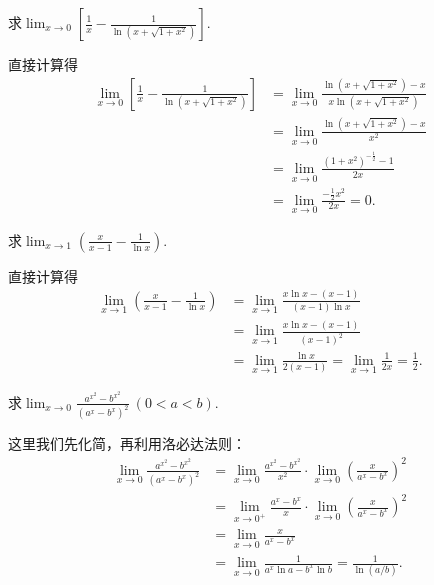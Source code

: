 \begin{example}
求\(\lim_{x\to0} \left[ \frac1x - \frac1{\ln(x+\sqrt{1+x^2})} \right]\).
\begin{solution}
直接计算得\begin{align*}
	\lim_{x\to0} \left[ \frac1x - \frac1{\ln(x+\sqrt{1+x^2})} \right]
	&= \lim_{x\to0} \frac{\ln(x+\sqrt{1+x^2}) - x}{x \ln(x+\sqrt{1+x^2})} \\
	&= \lim_{x\to0} \frac{\ln(x+\sqrt{1+x^2}) - x}{x^2} \\
	&= \lim_{x\to0} \frac{(1+x^2)^{-\frac12}-1}{2x} \\
	&= \lim_{x\to0} \frac{-\frac12 x^2}{2x}
	= 0.
\end{align*}
\end{solution}
\end{example}
\begin{example}
求\(\lim_{x\to1} \left( \frac{x}{x-1} - \frac1{\ln x} \right)\).
\begin{solution}
直接计算得\begin{align*}
	\lim_{x\to1} \left( \frac{x}{x-1} - \frac1{\ln x} \right)
	&= \lim_{x\to1} \frac{x \ln x - (x-1)}{(x-1) \ln x} \\
	&= \lim_{x\to1} \frac{x \ln x - (x-1)}{(x-1)^2} \\
	&= \lim_{x\to1} \frac{\ln x}{2(x-1)}
	= \lim_{x\to1} \frac1{2x}
	= \frac12.
\end{align*}
\end{solution}
\end{example}

\begin{example}
求\(\lim_{x\to0} \frac{a^{x^2}-b^{x^2}}{(a^x-b^x)^2}\ (0<a<b)\).
\begin{solution}
这里我们先化简，再利用洛必达法则：\begin{align*}
	\lim_{x\to0} \frac{a^{x^2}-b^{x^2}}{(a^x-b^x)^2}
	&= \lim_{x\to0} \frac{a^{x^2}-b^{x^2}}{x^2}
		\cdot \lim_{x\to0} \left(\frac{x}{a^x-b^x}\right)^2 \\
	&= \lim_{x\to0^+} \frac{a^x-b^x}{x}
		\cdot \lim_{x\to0} \left(\frac{x}{a^x-b^x}\right)^2 \\
	&= \lim_{x\to0} \frac{x}{a^x-b^x} \\
	&= \lim_{x\to0} \frac{1}{a^x \ln a - b^x \ln b}
	= \frac{1}{\ln(a/b)}.
\end{align*}
\end{solution}
\end{example}
